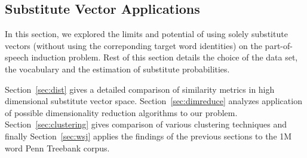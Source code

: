 \subsection{Substitute Vector Applications}
\label{sec:subapp}
In this section, we explored the limits and potential of using solely
substitute vectors (without using the correponding target word
identities) on the part-of-speech induction problem.  Rest of this
section details the choice of the data set, the vocabulary and the
estimation of substitute probabilities.  


Section~\ref{sec:dist} gives a detailed comparison of similarity
metrics in high dimensional substitute vector space.
Section~\ref{sec:dimreduce} analyzes application of possible
dimensionality reduction algorithms to our problem.
Section~\ref{sec:clustering} gives comparison of various clustering
techniques and finally Section~\ref{sec:wsj} applies the findings of
the previous sections to the 1M word Penn Treebank corpus.
